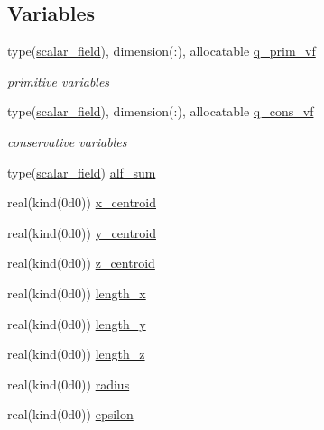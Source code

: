 \subsection*{Variables}
\begin{DoxyCompactItemize}
\item 
type(\hyperlink{structm__derived__types_1_1scalar__field}{scalar\+\_\+field}), dimension(\+:), allocatable \hyperlink{namespacem__initial__condition_ad9935d4b9c2f6a7af08f3630681d0c1a}{q\+\_\+prim\+\_\+vf}
\begin{DoxyCompactList}\small\item\em primitive variables \end{DoxyCompactList}\item 
type(\hyperlink{structm__derived__types_1_1scalar__field}{scalar\+\_\+field}), dimension(\+:), allocatable \hyperlink{namespacem__initial__condition_a1f42c68f3b3d167616d52b7cf7a7d56a}{q\+\_\+cons\+\_\+vf}
\begin{DoxyCompactList}\small\item\em conservative variables \end{DoxyCompactList}\item 
type(\hyperlink{structm__derived__types_1_1scalar__field}{scalar\+\_\+field}) \hyperlink{namespacem__initial__condition_a2fa2c238e1c0c522aeecada3f6cc314d}{alf\+\_\+sum}
\item 
real(kind(0d0)) \hyperlink{namespacem__initial__condition_aaf66843a6e051174a3cde0729daa1300}{x\+\_\+centroid}
\item 
real(kind(0d0)) \hyperlink{namespacem__initial__condition_a6cef3dccb0374a24cb372bd7d4c0b43f}{y\+\_\+centroid}
\item 
real(kind(0d0)) \hyperlink{namespacem__initial__condition_aca427fa4af7501277f10bf96977a9766}{z\+\_\+centroid}
\item 
real(kind(0d0)) \hyperlink{namespacem__initial__condition_ab59e590873d32a54651ac60af6b1a6e4}{length\+\_\+x}
\item 
real(kind(0d0)) \hyperlink{namespacem__initial__condition_a49ed82b4f9548cd8166844888028c8cd}{length\+\_\+y}
\item 
real(kind(0d0)) \hyperlink{namespacem__initial__condition_a0d9d1bcde238177f0beb7684e252aa69}{length\+\_\+z}
\item 
real(kind(0d0)) \hyperlink{namespacem__initial__condition_a51a6afec0ff2f62c62b6cf86bd2c16e4}{radius}
\item 
real(kind(0d0)) \hyperlink{namespacem__initial__condition_a0fb096d74052e49545e6ec72b3c2a114}{epsilon}

\end{DoxyCompactItemize}
